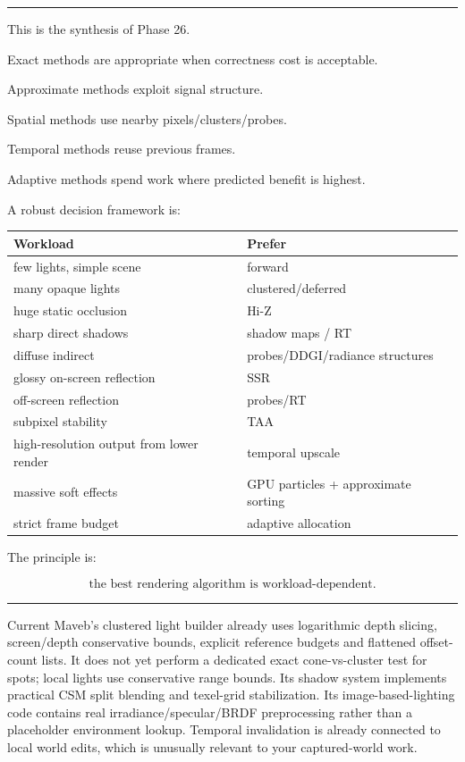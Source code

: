 \begin{center}\rule{0.5\linewidth}{0.5pt}\end{center}

This is the synthesis of Phase 26.

Exact methods are appropriate when correctness cost is acceptable.

Approximate methods exploit signal structure.

Spatial methods use nearby pixels/clusters/probes.

Temporal methods reuse previous frames.

Adaptive methods spend work where predicted benefit is highest.

A robust decision framework is:

{\def\LTcaptype{none} %
\begin{longtable}[]{@{}ll@{}}
\toprule\noalign{}
Workload & Prefer \\
\midrule\noalign{}
\endhead
\bottomrule\noalign{}
\endlastfoot
few lights, simple scene & forward \\
many opaque lights & clustered/deferred \\
huge static occlusion & Hi-Z \\
sharp direct shadows & shadow maps / RT \\
diffuse indirect & probes/DDGI/radiance structures \\
glossy on-screen reflection & SSR \\
off-screen reflection & probes/RT \\
subpixel stability & TAA \\
high-resolution output from lower render & temporal upscale \\
massive soft effects & GPU particles + approximate sorting \\
strict frame budget & adaptive allocation \\
\end{longtable}
}

The principle is:

\[
\boxed{
\text{the best rendering algorithm is workload-dependent}.
}
\]

\begin{center}\rule{0.5\linewidth}{0.5pt}\end{center}

Current Maveb's clustered light builder already uses logarithmic depth slicing, screen/depth conservative bounds, explicit reference budgets and flattened offset-count lists. It does not yet perform a dedicated exact cone-vs-cluster test for spots; local lights use conservative range bounds. Its shadow system implements practical CSM split blending and texel-grid stabilization. Its image-based-lighting code contains real irradiance/specular/BRDF preprocessing rather than a placeholder environment lookup. Temporal invalidation is already connected to local world edits, which is unusually relevant to your captured-world work.

